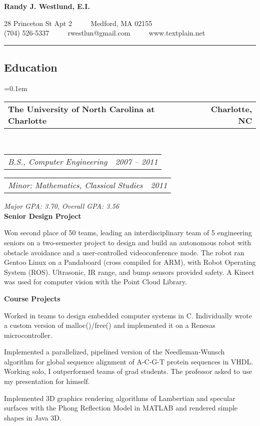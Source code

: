 \documentclass[10pt,letterpaper]{article}
\makeatletter
\newcommand{\headerrow}[2]
{\begin{tabular*}{\linewidth}{l@{\extracolsep{\fill}}r}
	#1 &
	#2 \\
\end{tabular*}}
\makeatother
\begin{document}
\begin{center}
{\LARGE \textbf{Randy J. Westlund, E.I.}}

28 Princeton St Apt 2 \ \ \textbullet
\ \ Medford, MA 02155
\\
(704) 526-5337 \ \ \textbullet
\ \ rwestlun@gmail.com \ \ \textbullet
\ \ www.textplain.net
\end{center}

\hrule
\vspace{-0.4em}
\subsection*{Education}

\begin{itemize*}
	\parskip=0.1em

	\item 
	\headerrow
		{\textbf{The University of North Carolina at Charlotte}}
		{\textbf{Charlotte, NC}}
	\\
	\headerrow
		{\emph{B.S., Computer Engineering}}
		{\emph{2007 -- 2011}}
	\headerrow
		{\emph{Minor: Mathematics, Classical Studies}}
		{\emph{2011}}
        \emph{Major GPA: 3.70, Overall GPA: 3.56} \\
        \textbf{Senior Design Project}
        \begin{itemize*}
            \item Won second place of 50 teams, leading an interdisciplinary team of 5 engineering seniors on a two-semester project to design and build an autonomous robot with obstacle avoidance and a user-controlled videoconference mode. The robot ran Gentoo Linux on a Pandaboard (cross compiled for ARM), with Robot Operating System (ROS). Ultrasonic, IR range, and bump sensors provided safety. A Kinect was used for computer vision with the Point Cloud Library.
        \end{itemize*}
    \textbf{Course Projects}
    \begin{itemize*}
        \item Worked in teams to design embedded computer systems in C. Individually wrote a custom version of malloc()/free() and implemented it on a Renesas microcontroller.
        \item Implemented a parallelized, pipelined version of the Needleman-Wunsch algorithm for global sequence alignment of A-C-G-T protein sequences in VHDL\@.  Working solo, I outperformed teams of grad students.  The professor asked to use my presentation for himself.
        \item Implemented 3D graphics rendering algorithms of Lambertian and specular surfaces with the Phong Reflection Model in MATLAB and rendered simple shapes in Java 3D.

\end{itemize*}
\end{itemize*}
\end{document}
